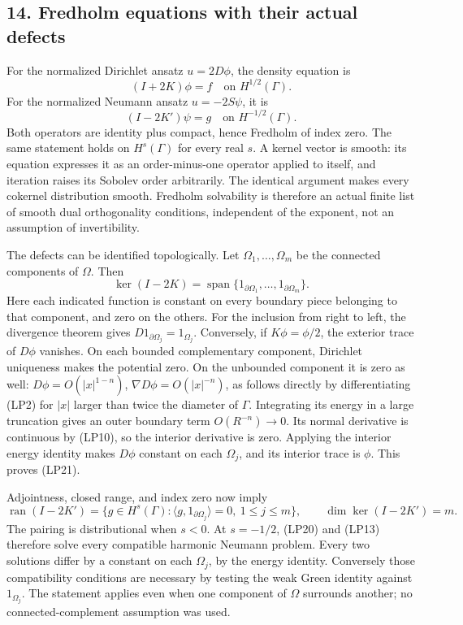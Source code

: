 \documentclass[
  11pt,
]{article}
\begin{document}
\subsection{14. Fredholm equations with their actual
defects}\label{fredholm-equations-with-their-actual-defects}

For the normalized Dirichlet ansatz \(u=2D\phi\), the density equation
is \[
 (I+2K)\phi=f\quad\text{on }H^{1/2}(\Gamma).
 \tag{LP19}
\] For the normalized Neumann ansatz \(u=-2S\psi\), it is \[
 (I-2K')\psi=g\quad\text{on }H^{-1/2}(\Gamma).
 \tag{LP20}
\] Both operators are identity plus compact, hence Fredholm of index
zero. The same statement holds on \(H^s(\Gamma)\) for every real \(s\).
A kernel vector is smooth: its equation expresses it as an
order-minus-one operator applied to itself, and iteration raises its
Sobolev order arbitrarily. The identical argument makes every cokernel
distribution smooth. Fredholm solvability is therefore an actual finite
list of smooth dual orthogonality conditions, independent of the
exponent, not an assumption of invertibility.

The defects can be identified topologically. Let
\(\Omega_1,\ldots,\Omega_m\) be the connected components of \(\Omega\).
Then \[
 \ker(I-2K)=\operatorname{span}\{1_{\partial\Omega_1},\ldots,
 1_{\partial\Omega_m}\}.
 \tag{LP21}
\] Here each indicated function is constant on every boundary piece
belonging to that component, and zero on the others. For the inclusion
from right to left, the divergence theorem gives
\(D1_{\partial\Omega_j}=1_{\Omega_j}\). Conversely, if \(K\phi=\phi/2\),
the exterior trace of \(D\phi\) vanishes. On each bounded complementary
component, Dirichlet uniqueness makes the potential zero. On the
unbounded component it is zero as well: \(D\phi=O(|x|^{1-n})\),
\(\nabla D\phi=O(|x|^{-n})\), as follows directly by differentiating
(LP2) for \(|x|\) larger than twice the diameter of \(\Gamma\).
Integrating its energy in a large truncation gives an outer boundary
term \(O(R^{-n})\to0\). Its normal derivative is continuous by (LP10),
so the interior derivative is zero. Applying the interior energy
identity makes \(D\phi\) constant on each \(\Omega_j\), and its interior
trace is \(\phi\). This proves (LP21).

Adjointness, closed range, and index zero now imply \[
 \operatorname{ran}(I-2K')
 =\{g\in H^s(\Gamma):\langle g,1_{\partial\Omega_j}\rangle=0,
       \ 1\le j\le m\},
 \qquad \dim\ker(I-2K')=m.
 \tag{LP22}
\] The pairing is distributional when \(s<0\). At \(s=-1/2\), (LP20) and
(LP13) therefore solve every compatible harmonic Neumann problem. Every
two solutions differ by a constant on each \(\Omega_j\), by the energy
identity. Conversely those compatibility conditions are necessary by
testing the weak Green identity against \(1_{\Omega_j}\). The statement
applies even when one component of \(\Omega\) surrounds another; no
connected-complement assumption was used.
\end{document}
